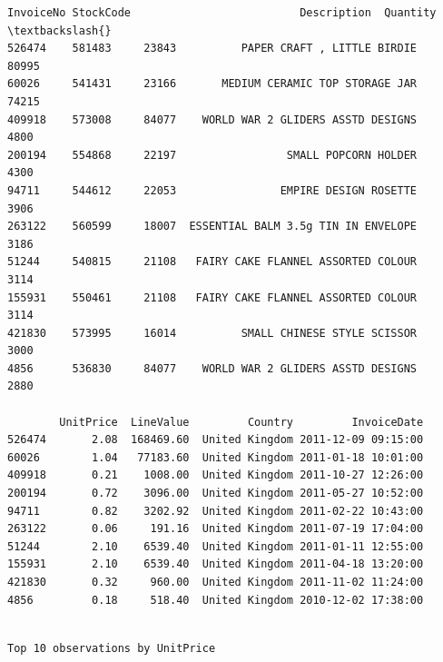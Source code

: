 \documentclass[11pt]{article}
\begin{document}
    
    \begin{Verbatim}[commandchars=\\\{\}]
       InvoiceNo StockCode                          Description  Quantity  \textbackslash{}
526474    581483     23843          PAPER CRAFT , LITTLE BIRDIE     80995   
60026     541431     23166       MEDIUM CERAMIC TOP STORAGE JAR     74215   
409918    573008     84077    WORLD WAR 2 GLIDERS ASSTD DESIGNS      4800   
200194    554868     22197                 SMALL POPCORN HOLDER      4300   
94711     544612     22053                EMPIRE DESIGN ROSETTE      3906   
263122    560599     18007  ESSENTIAL BALM 3.5g TIN IN ENVELOPE      3186   
51244     540815     21108   FAIRY CAKE FLANNEL ASSORTED COLOUR      3114   
155931    550461     21108   FAIRY CAKE FLANNEL ASSORTED COLOUR      3114   
421830    573995     16014          SMALL CHINESE STYLE SCISSOR      3000   
4856      536830     84077    WORLD WAR 2 GLIDERS ASSTD DESIGNS      2880   

        UnitPrice  LineValue         Country         InvoiceDate  
526474       2.08  168469.60  United Kingdom 2011-12-09 09:15:00  
60026        1.04   77183.60  United Kingdom 2011-01-18 10:01:00  
409918       0.21    1008.00  United Kingdom 2011-10-27 12:26:00  
200194       0.72    3096.00  United Kingdom 2011-05-27 10:52:00  
94711        0.82    3202.92  United Kingdom 2011-02-22 10:43:00  
263122       0.06     191.16  United Kingdom 2011-07-19 17:04:00  
51244        2.10    6539.40  United Kingdom 2011-01-11 12:55:00  
155931       2.10    6539.40  United Kingdom 2011-04-18 13:20:00  
421830       0.32     960.00  United Kingdom 2011-11-02 11:24:00  
4856         0.18     518.40  United Kingdom 2010-12-02 17:38:00  
    \end{Verbatim}

    
    \begin{Verbatim}[commandchars=\\\{\}]

Top 10 observations by UnitPrice
    \end{Verbatim}
\end{document}
